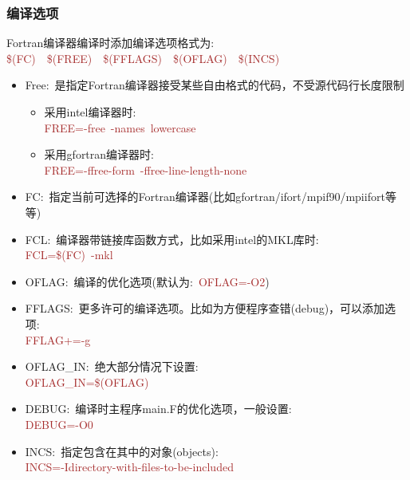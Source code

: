 \subsubsection{\rm{编译选项}}
\textrm{Fortran}编译器编译时添加编译选项格式为:\\
\textcolor{brown}{\textrm{\$(FC)~~\$(FREE)~~\$(FFLAGS)~~\$(OFLAG)~~\$(INCS)}}\\
\begin{itemize}
	\item \textrm{Free}:~是指定\textrm{Fortran}编译器接受某些自由格式的代码，不受源代码行长度限制
		\begin{itemize}
			\item 采用\textrm{intel}编译器时:\\
				\textcolor{brown}{\textrm{FREE=-free~-names~lowercase}}
			\item 采用\textrm{gfortran}编译器时:\\
				\textcolor{brown}{\textrm{FREE=-ffree-form~-ffree-line-length-none}}
		\end{itemize}
	\item \textrm{FC}:~指定当前可选择的\textrm{Fortran}编译器(比如\textrm{gfortran/ifort/mpif90/mpiifort}等等)
	\item \textrm{FCL}:~编译器带链接库函数方式，比如采用\textrm{intel}的\textrm{MKL}库时:\\
		\textcolor{brown}{\textrm{FCL=\$(FC)}~-mkl}
	\item \textrm{OFLAG}:~编译的优化选项(默认为:~\textcolor{brown}{\textrm{OFLAG=-O2}})
	\item \textrm{FFLAGS}:~更多许可的编译选项。比如为方便程序查错(\textrm{debug})，可以添加选项:\\
		\textcolor{brown}{\textrm{FFLAG+=-g}}
	\item \textrm{OFLAG\_IN}:~绝大部分情况下设置:\\
		\textcolor{brown}{\textrm{OFLAG\_IN=\$(OFLAG)}}
	\item \textrm{DEBUG}:~编译时主程序\textrm{main.F}的优化选项，一般设置:\\
		\textcolor{brown}{\textrm{DEBUG=-O0}}
	\item \textrm{INCS}:~指定包含在其中的对象(\textrm{objects}):\\
		\textcolor{brown}{\textrm{INCS=-Idirectory-with-files-to-be-included}}
\end{itemize}
